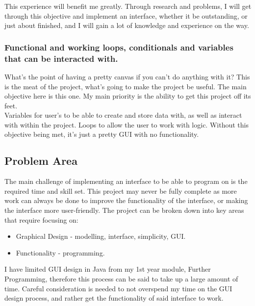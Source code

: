 \documentclass[a4paper, 12pt]{article}
\begin{document}
                This experience will benefit me greatly. Through research and problems, I will
                get through this objective and implement an interface, whether it be outstanding,
                or just about finished, and I will gain a lot of knowledge and experience on
                the way.

            \subsubsection{Functional and working loops, conditionals and
            variables that can be interacted with.}
                What's the point of having a pretty canvas if you can't do anything with it?
                This is the meat of the project, what's going to make the project be useful.
                The main objective here is this one. My main priority is the ability to get
                this project off its feet. \\

                Variables for user's to be able to create and store data with, as well as
                interact with within the project. Loops to allow the user to work with logic.
                Without this objective being met, it's just a pretty GUI with no functionality.

        \subsection{Problem Area}
            The main challenge of implementing an interface to be able to program on is the required 
            time and skill set. This project may never be fully complete as more work can always be 
            done to improve the functionality of the interface, or making the interface more user-friendly.
            The project can be broken down into key areas that require focusing on:
        
            \begin{itemize}
                \item Graphical Design - modelling, interface, simplicity, GUI.
                \item Functionality - programming.
            \end{itemize}

            I have limited GUI design in Java from my 1st year module, Further Programming, therefore this 
            process can be said to take up a large amount of time. Careful consideration is needed to 
            not overspend my time on the GUI design process, and rather get the functionality of said 
            interface to work. \\
\end{document}
